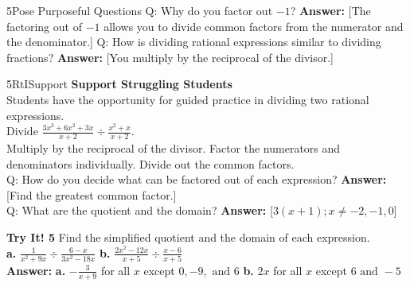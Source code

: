 \documentclass{article}
\newenvironment{tryit}[1]{\textbf{Try It! #1}}{}
\newenvironment{te-addendum}[2]{\textbf{TE (#1 - #2)}}{}
\newcommand{\answer}[1]{\textbf{Answer:} #1}
\begin{document}
\begin{te-addendum}{5}{Pose Purposeful Questions}
Q: Why do you factor out $-1$?
\answer{[The factoring out of $-1$ allows you to divide common factors from the numerator and the denominator.]}
Q: How is dividing rational expressions similar to dividing fractions?
\answer{[You multiply by the reciprocal of the divisor.]}
\end{te-addendum}

\begin{te-addendum}{5}{RtISupport}
\textbf{Support Struggling Students} \\
Students have the opportunity for guided practice in dividing two rational expressions. \\
Divide $\frac{3x^3 + 6x^2 + 3x}{x+2} \div \frac{x^2+x}{x+2}$. \\
Multiply by the reciprocal of the divisor. Factor the numerators and denominators individually. Divide out the common factors. \\
Q: How do you decide what can be factored out of each expression? \answer{[Find the greatest common factor.]} \\
Q: What are the quotient and the domain? \answer{[$3(x+1); x \neq -2, -1, 0$]}
\end{te-addendum}

\begin{tryit}{5}
Find the simplified quotient and the domain of each expression. \\
\textbf{a.} $\frac{1}{x^2 + 9x} \div \frac{6 - x}{3x^2 - 18x}$ \qquad \textbf{b.} $\frac{2x^2 - 12x}{x + 5} \div \frac{x - 6}{x + 5}$ \\
\answer{\textbf{a.} $-\frac{3}{x+9}$ for all $x$ except $0, -9, \text{ and } 6$ \qquad \textbf{b.} $2x$ for all $x$ except $6 \text{ and } -5$}
\end{tryit}
\end{document}
